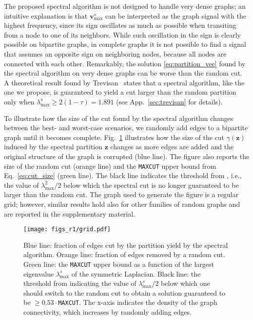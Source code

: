 \documentclass[journal]{IEEEtran}
\def\z{{\mathbf z}}
\def\v{{\mathbf v}}
\newcommand{\maxcut}{\texttt{\small{MAXCUT}}}
\begin{document}
The proposed spectral algorithm is not designed to handle very dense graphs; an intuitive explanation is that $\v^s_\text{max}$ can be interpreted as the graph signal with the highest frequency, since its sign oscillates as much as possible when transiting from a node to one of its neighbors. 
While such oscillation in the sign is clearly possible on bipartite graphs, in complete graphs it is not possible to find a signal that assumes an opposite sign on neighboring nodes, because all nodes are connected with each other.
Remarkably, the solution \eqref{eq:partition_vec} found by the spectral algorithm on very dense graphs can be worse than the random cut.
A theoretical result found by Trevisan~\cite{trevisan2012max} states that a spectral algorithm, like the one we propose, is guaranteed to yield a cut larger than the random partition only when $\lambda^s_\text{max} \geq 2(1-\tau) = 1.891$ (see App.~\ref{sec:trevisan} for details).

To illustrate how the size of the cut found by the spectral algorithm changes between the best- and worst-case scenarios, we randomly add edges to a bipartite graph until it becomes complete.
Fig.~\ref{fig:adding_edges} illustrates how the size of the cut $\gamma(\z)$ induced by the spectral partition $\z$ changes as more edges are added and the original structure of the graph is corrupted (blue line). The figure also reports the size of the random cut (orange line) and the \maxcut{} upper bound from Eq.~\eqref{eq:cut_size} (green line). The black line indicates the threshold from \cite{trevisan2012max}, i.e., the value of $\lambda^2_\text{max}/2$ below which the spectral cut is no longer guaranteed to be larger than the random cut.
The graph used to generate the figure is a regular grid; however, similar results hold also for other families of random graphs and are reported in the supplementary material.
\begin{figure}[!ht]
    \centering
    \texttt{[image: figs\_r1/grid.pdf]}    
    \caption{
    Blue line: fraction of edges cut by the partition yield by the spectral algorithm. 
    Orange line: fraction of edges removed by a random cut. 
    Green line: the \maxcut{} upper bound as a function of the largest eigenvalue $\lambda^s_\text{max}$ of the symmetric Laplacian. 
    Black line: the threshold from \cite{trevisan2012max} indicating the value of $\lambda^s_\text{max}/2$ below which one should switch to the random cut to obtain a solution guaranteed to be $\geq 0.53\cdot$\maxcut{}. 
    The x-axis indicates the density of the graph connectivity, which increases by randomly adding edges.}
    \label{fig:adding_edges}
\end{figure}
\end{document}
